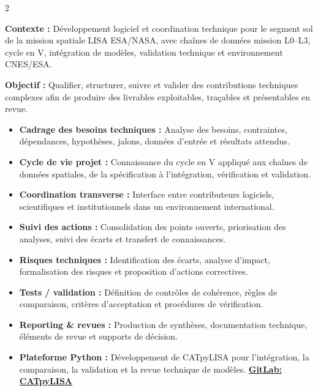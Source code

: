 \documentclass[8pt,a4paper,ragged2e,withhyper]{altacv}
\begin{document}
\begin{paracol}{2}
\divider


\textbf{Contexte :} Développement logiciel et coordination technique pour le segment sol de la mission spatiale LISA ESA/NASA, avec chaînes de données mission L0--L3, cycle en V, intégration de modèles, validation technique et environnement CNES/ESA.

\textbf{Objectif :} Qualifier, structurer, suivre et valider des contributions techniques complexes afin de produire des livrables exploitables, traçables et présentables en revue.

\begin{itemize}
  \item \textbf{Cadrage des besoins techniques :} Analyse des besoins, contraintes, dépendances, hypothèses, jalons, données d’entrée et résultats attendus.
  \item \textbf{Cycle de vie projet :} Connaissance du cycle en V appliqué aux chaînes de données spatiales, de la spécification à l’intégration, vérification et validation.
  \item \textbf{Coordination transverse :} Interface entre contributeurs logiciels, scientifiques et institutionnels dans un environnement international.
  \item \textbf{Suivi des actions :} Consolidation des points ouverts, priorisation des analyses, suivi des écarts et transfert de connaissances.
  \item \textbf{Risques techniques :} Identification des écarts, analyse d’impact, formalisation des risques et proposition d’actions correctives.
  \item \textbf{Tests / validation :} Définition de contrôles de cohérence, règles de comparaison, critères d’acceptation et procédures de vérification.
  \item \textbf{Reporting \& revues :} Production de synthèses, documentation technique, éléments de revue et supports de décision.
  \item \textbf{Plateforme Python :} Développement de CATpyLISA pour l’intégration, la comparaison, la validation et la revue technique de modèles.
  \textcolor{DarkPastelRed}{\href{https://gitlab.oca.eu/gboileau/lisa_l3_tools}{\bf GitLab: CATpyLISA}}
\end{itemize}

\divider



\end{paracol}
\end{document}

